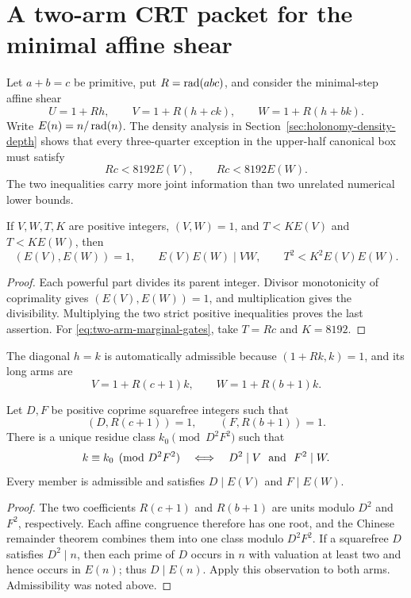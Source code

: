 \section{A two-arm CRT packet for the minimal affine shear}
\label{sec:affine-two-arm-crt}

Let $a+b=c$ be primitive, put $R=\operatorname{rad}(abc)$, and consider the minimal-step
affine shear
\begin{equation}\label{eq:two-arm-shear}
 U=1+Rh,\qquad V=1+R(h+ck),\qquad W=1+R(h+bk).
\end{equation}
Write $E(n)=n/\operatorname{rad}(n)$.  The density analysis in
Section~\ref{sec:holonomy-density-depth} shows that every three-quarter
exception in the upper-half canonical box must satisfy
\begin{equation}\label{eq:two-arm-marginal-gates}
 Rc<8192E(V),\qquad Rc<8192E(W).
\end{equation}
The two inequalities carry more joint information than two unrelated
numerical lower bounds.

\begin{theorem}\label{thm:two-arm-joint-carrier}
If $V,W,T,K$ are positive integers, $(V,W)=1$, and
$T<KE(V)$ and $T<KE(W)$, then
\[
 (E(V),E(W))=1,\qquad E(V)E(W)\mid VW,
 \qquad T^2<K^2E(V)E(W).
\]
\end{theorem}

\begin{proof}
Each powerful part divides its parent integer.  Divisor monotonicity of
coprimality gives $(E(V),E(W))=1$, and multiplication gives the divisibility.
Multiplying the two strict positive inequalities proves the last assertion.
For \eqref{eq:two-arm-marginal-gates}, take $T=Rc$ and $K=8192$.
\end{proof}

The diagonal $h=k$ is automatically admissible because
$(1+Rk,k)=1$, and its long arms are
\[
             V=1+R(c+1)k,\qquad W=1+R(b+1)k.
\]

\begin{theorem}
\label{thm:two-arm-crt-packet}
Let $D,F$ be positive coprime squarefree integers such that
\[
 (D,R(c+1))=1,\qquad(F,R(b+1))=1.
\]
There is a unique residue class $k_0\pmod {D^2F^2}$ such that
\[
 k\equiv k_0\pmod {D^2F^2}
 \quad\Longleftrightarrow\quad D^2\mid V\ \hbox{ and }\ F^2\mid W.
\]
Every member is admissible and satisfies $D\mid E(V)$ and $F\mid E(W)$.
\end{theorem}

\begin{proof}
The two coefficients $R(c+1)$ and $R(b+1)$ are units modulo $D^2$ and
$F^2$, respectively.  Each affine congruence therefore has one root, and
the Chinese remainder theorem combines them into one class modulo $D^2F^2$.
If a squarefree $D$ satisfies $D^2\mid n$, then each prime of $D$ occurs in
$n$ with valuation at least two and hence occurs in $E(n)$; thus $D\mid E(n)$.
Apply this observation to both arms.  Admissibility was noted above.
\end{proof}

